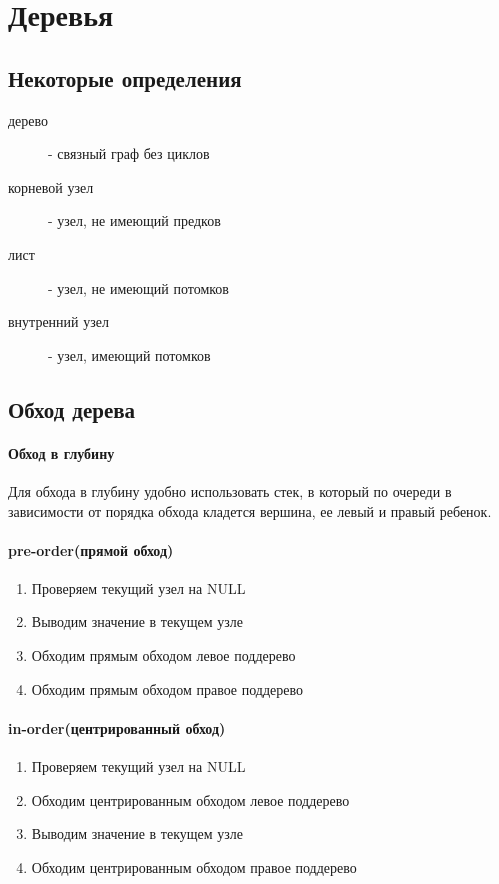 \documentclass[a4paper,10pt]{article}
\begin{document}
\section{Деревья}
\subsection{Некоторые определения}
\begin{description}
	\item[дерево] - связный граф без циклов
	\item[корневой узел] - узел, не имеющий предков
	\item[лист] - узел, не имеющий потомков
	\item[внутренний узел] - узел, имеющий потомков
\end{description}
\subsection{Обход дерева}
\paragraph{Обход в глубину} Для обхода в глубину удобно использовать стек, в который по очереди в зависимости от порядка обхода кладется вершина, ее левый и правый ребенок. 
\paragraph{pre-order(прямой обход)}
\begin{enumerate}
	\item  Проверяем текущий узел на NULL
	\item  Выводим значение в текущем узле
	\item  Обходим прямым обходом левое поддерево
	\item  Обходим прямым обходом правое поддерево
\end{enumerate}

\paragraph{in-order(центрированный обход)}
\begin{enumerate}
	\item  Проверяем текущий узел на NULL
	\item  Обходим центрированным обходом левое поддерево
	\item  Выводим значение в текущем узле
	\item  Обходим центрированным обходом правое поддерево
\end{enumerate}
\end{document}
